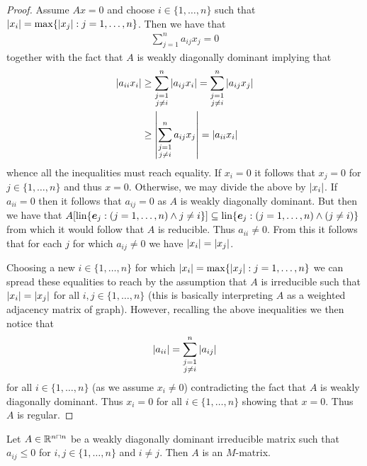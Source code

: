 \documentclass[8pt,a4paper]{article}
\begin{document}
\begin{proof}
Assume $Ax=0$ and choose $i\in\{1,\ldots,n\}$ such that $\left|x_i\right|=\max\{\left|x_j\right|:j=1,\ldots,n\}$. Then we have
that
\begin{align}
\sum_{j=1}^n{a_{ij}x_j}=0
\end{align}
together with the fact that $A$ is weakly diagonally dominant implying that
\begin{align}
\left|a_{ii}x_i\right| 
 &\geq \sum_{\substack{j=1\\ j\neq
     i}}^n{\left|a_{ij}x_i\right|} = \sum_{\substack{j=1\\ j\neq
     i}}^n{\left|a_{ij}x_j\right|}\\
 &\geq \left|\sum_{\substack{j=1\\ j\neq
     i}}^n{a_{ij}x_j}\right| = \left|a_{ii}x_i\right|
\end{align}
whence all the inequalities must reach equality. If $x_i=0$ it follows
that $x_j=0$ for $j\in\{1,\ldots,n\}$ and thus $x=0$. Otherwise, we may
divide the above by $\left|x_i\right|$. If $a_{ii}=0$ then it follows that
$a_{ij}=0$ as $A$ is weakly diagonally dominant. But then we have that
$A[\mathop\mathrm{lin}\{\boldsymbol{e}_j:(j=1,\ldots,n)\wedge j\neq
i\}]\subseteq\mathop\mathrm{lin}\{\boldsymbol{e}_j:(j=1,\ldots,n)\wedge (j\neq i)\}$ from which it would
follow that $A$ is reducible. Thus $a_{ii}\neq 0$. From this it
follows that for each $j$ for which $a_{ij}\neq 0$ we have
$\left|x_i\right|=\left|x_j\right|$.

Choosing a new $i\in\{1,\ldots,n\}$ for which
$\left|x_i\right|=\max\{\left|x_j\right|:j=1,\ldots,n\}$ we can spread these
equalities to reach by the assumption that $A$ is irreducible such that
$\left|x_i\right|=\left|x_j\right|$ for all $i,j\in\{1,\ldots,n\}$ (this is
basically interpreting $A$ as a weighted adjacency matrix of graph).
However, recalling the above inequalities we then notice that
\begin{align}
\left|a_{ii}\right|=\sum_{\substack{j=1\\ j\neq i}}^n{\left|a_{ij}\right|}
\end{align}
for all $i\in\{1,\ldots,n\}$ (as we assume $x_i\neq 0$) contradicting the fact that $A$ is weakly
diagonally dominant. Thus $x_i=0$ for all $i\in\{1,\ldots,n\}$ showing
that $x=0$. Thus $A$ is regular.
\end{proof}

\begin{lemma}
Let $A\in \mathbb{R}^{n\mathbin{\sqcap} n}$ be a weakly diagonally dominant
irreducible matrix such that $a_{ij}\leq 0$ for $i,j\in\{1,\ldots,n\}$
and $i\neq j$. Then $A$ is an $M$-matrix. 
\end{lemma}
\end{document}
